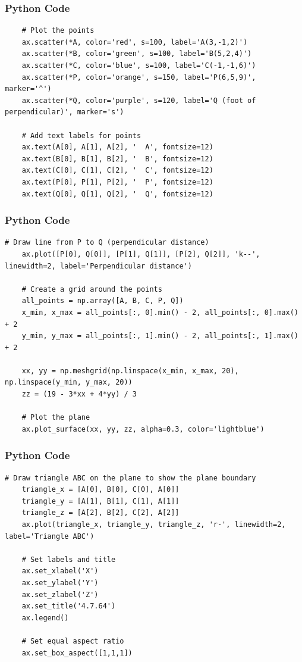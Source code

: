 \documentclass{beamer}
\begin{document}
\begin{frame}[fragile]
    \frametitle{Python Code}
    \begin{lstlisting}
    # Plot the points
    ax.scatter(*A, color='red', s=100, label='A(3,-1,2)')
    ax.scatter(*B, color='green', s=100, label='B(5,2,4)')
    ax.scatter(*C, color='blue', s=100, label='C(-1,-1,6)')
    ax.scatter(*P, color='orange', s=150, label='P(6,5,9)', marker='^')
    ax.scatter(*Q, color='purple', s=120, label='Q (foot of perpendicular)', marker='s')

    # Add text labels for points
    ax.text(A[0], A[1], A[2], '  A', fontsize=12)
    ax.text(B[0], B[1], B[2], '  B', fontsize=12)
    ax.text(C[0], C[1], C[2], '  C', fontsize=12)
    ax.text(P[0], P[1], P[2], '  P', fontsize=12)
    ax.text(Q[0], Q[1], Q[2], '  Q', fontsize=12)
    \end{lstlisting}
\end{frame}

\begin{frame}[fragile]
    \frametitle{Python Code}
    \begin{lstlisting}
# Draw line from P to Q (perpendicular distance)
    ax.plot([P[0], Q[0]], [P[1], Q[1]], [P[2], Q[2]], 'k--', linewidth=2, label='Perpendicular distance')
    
    # Create a grid around the points
    all_points = np.array([A, B, C, P, Q])
    x_min, x_max = all_points[:, 0].min() - 2, all_points[:, 0].max() + 2
    y_min, y_max = all_points[:, 1].min() - 2, all_points[:, 1].max() + 2

    xx, yy = np.meshgrid(np.linspace(x_min, x_max, 20), np.linspace(y_min, y_max, 20))
    zz = (19 - 3*xx + 4*yy) / 3

    # Plot the plane
    ax.plot_surface(xx, yy, zz, alpha=0.3, color='lightblue')
    \end{lstlisting}
\end{frame}

\begin{frame}[fragile]
    \frametitle{Python Code}
    \begin{lstlisting}
# Draw triangle ABC on the plane to show the plane boundary
    triangle_x = [A[0], B[0], C[0], A[0]]
    triangle_y = [A[1], B[1], C[1], A[1]]
    triangle_z = [A[2], B[2], C[2], A[2]]
    ax.plot(triangle_x, triangle_y, triangle_z, 'r-', linewidth=2, label='Triangle ABC')

    # Set labels and title
    ax.set_xlabel('X')
    ax.set_ylabel('Y')
    ax.set_zlabel('Z')
    ax.set_title('4.7.64')
    ax.legend()

    # Set equal aspect ratio
    ax.set_box_aspect([1,1,1])
    \end{lstlisting}
\end{frame}
\end{document}
